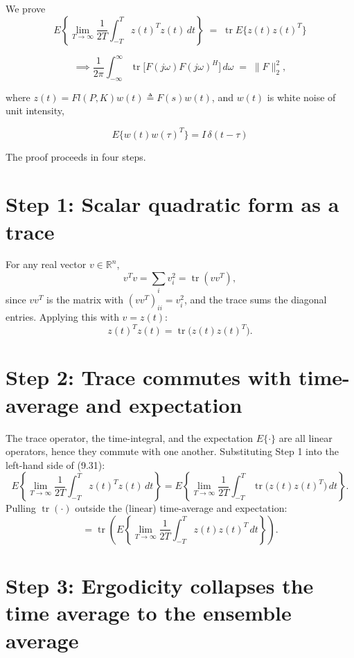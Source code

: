 

We prove
\begin{equation}
    E\left\{\lim_{T\to\infty}\frac{1}{2T}\int_{-T}^{T} z(t)^Tz(t)\,dt\right\}
    \;=\;
    \operatorname{tr}E\{z(t)z(t)^T\}
\end{equation}

\begin{equation}
    \implies
    \frac{1}{2\pi}\int_{-\infty}^{\infty}\operatorname{tr}\big[F(j\omega)F(j\omega)^H\big]\,d\omega
    \;=\;
    \|F\|_2^2,
\end{equation}

where $z(t) = Fl(P,K)w(t) \triangleq F(s)w(t)$, and $w(t)$ is white noise of unit intensity,

\[
    E\{w(t)w(\tau)^T\} = I\,\delta(t-\tau)
\]

\bigskip
\noindent The proof proceeds in four steps.

\section*{Step 1: Scalar quadratic form as a trace}

For any real vector $v \in \mathbb{R}^n$,
\[
    v^Tv = \sum_i v_i^2 = \operatorname{tr}(vv^T),
\]
since $vv^T$ is the matrix with $(vv^T)_{ii} = v_i^2$, and the trace sums the diagonal entries. Applying this with $v = z(t)$:
\[
    z(t)^Tz(t) = \operatorname{tr}\big(z(t)z(t)^T\big).
\]

\section*{Step 2: Trace commutes with time-average and expectation}

The trace operator, the time-integral, and the expectation $E\{\cdot\}$ are all linear operators, hence they commute with one another. Substituting Step 1 into the left-hand side of (9.31):
\[
    E\left\{\lim_{T\to\infty}\frac{1}{2T}\int_{-T}^{T} z(t)^Tz(t)\,dt\right\}
    = E\left\{\lim_{T\to\infty}\frac{1}{2T}\int_{-T}^{T} \operatorname{tr}\big(z(t)z(t)^T\big)\,dt\right\}.
\]
Pulling $\operatorname{tr}(\cdot)$ outside the (linear) time-average and expectation:
\[
    = \operatorname{tr}\left(E\left\{\lim_{T\to\infty}\frac{1}{2T}\int_{-T}^{T} z(t)z(t)^T\,dt\right\}\right).
\]

\section*{Step 3: Ergodicity collapses the time average to the ensemble average}


